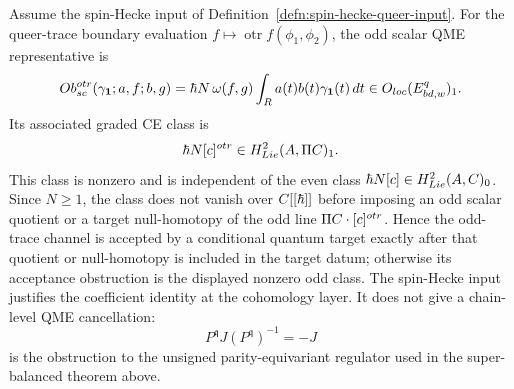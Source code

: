 \begin{thm}\label{thm:queer-u1-center-anomaly-spin-hecke}
  Assume the spin-Hecke input of
  Definition~\ref{defn:spin-hecke-queer-input}.  For the queer-trace
  boundary evaluation
  \(f\mapsto\operatorname{otr} f(\phi_1,\phi_2)\), the odd scalar QME
  representative is
  \[
    Ob^{otr}_{sc}
    (\gamma_{\mathbf 1};a,f;b,g)
    =
    \hbar N\,\omega(f,g)
    \int_{R} a(t)b(t)\gamma_{\mathbf 1}(t)\,dt
    \in
    O_{loc}(E^{q}_{bd,w})_{1}.
  \]
  Its associated graded CE class is
  \[
    \hbar N[c]^{otr}
    \in H^2_{Lie}(A,\Pi C)_{1}.
  \]
  This class is nonzero and is independent of the even class
  \(\hbar N[c]\in H^2_{Lie}(A,C)_{0}\).
  Since \(N\ge1\), the class does not vanish over \(C[[\hbar]]\) before
  imposing an odd scalar quotient or a target null-homotopy of the odd
  line \(\Pi C\cdot[c]^{otr}\).
  Hence the odd-trace channel is accepted by a conditional quantum
  target exactly after that quotient or null-homotopy is included in the
  target datum; otherwise its acceptance obstruction is the displayed
  nonzero odd class.
  The spin-Hecke input justifies the coefficient identity at the
  cohomology layer.  It does not give a chain-level QME cancellation:
  \[
    P^{\mathfrak q}J(P^{\mathfrak q})^{-1}=-J
  \]
  is the obstruction to the unsigned parity-equivariant regulator used
  in the super-balanced theorem above.
\end{thm}

